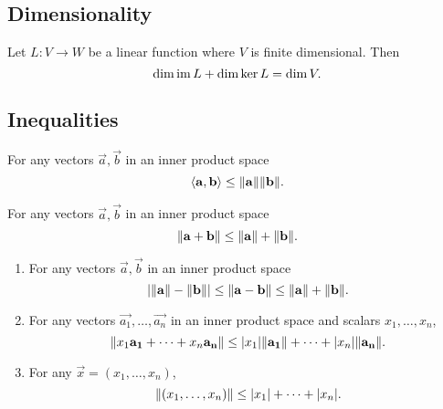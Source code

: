 \documentclass{article}
\begin{document}
\subsection{Dimensionality}
\begin{theorem}
    Let $L: V \rightarrow W$ be a linear function
    where $V$ is finite dimensional. Then
    \begin{equation}
        \dim \operatorname{im} L + \dim \ker L = \dim V.
    \end{equation}
\end{theorem}
\subsection{Inequalities}


\begin{theorem}
    For any vectors $\vec{a}, \vec{b}$ in an inner product space
    \begin{equation}
        \langle\mathbf{a}, \mathbf{b}\rangle \leq \lVert\mathbf{a}\rVert \lVert\mathbf{b}\rVert.
    \end{equation}
\end{theorem}

\begin{theorem}
    For any vectors $\vec{a}, \vec{b}$ in an inner product space
    \begin{equation}
        \lVert\mathbf{a} + \mathbf{b}\rVert \leq \lVert\mathbf{a}\rVert + \lVert\mathbf{b}\rVert.
    \end{equation}
\end{theorem}
\begin{corollary}
    \begin{enumerate}
        \item For any vectors $\vec{a}, \vec{b}$ in an inner product space
              \begin{equation}
                  \lvert\lVert \mathbf{a}\rVert - \lVert \mathbf{b}\rVert\rvert \leq \lVert\mathbf{a} - \mathbf{b}\rVert \leq \lVert\mathbf{a}\rVert + \lVert \mathbf{b}\rVert.
              \end{equation}
        \item For any vectors $\vec{a_1}, \ldots, \vec{a_n}$ in an inner product space and scalars $x_1, \ldots, x_n$,
              \begin{equation}
                  \lVert x_1\mathbf{a_1} + \cdots + x_n\mathbf{a_n}\rVert \leq |x_1| \lVert\mathbf{a_1}\rVert + \cdots + \lvert x_n\rvert\lVert\mathbf{a_n}\rVert.
              \end{equation}
        \item For any $\vec{x} = (x_1, \ldots, x_n)$,
              \begin{equation}
                  \lVert(x_1, \ldots, x_n)\rVert \leq \lvert x_1\rvert + \cdots + \lvert x_n\rvert.
              \end{equation}
    \end{enumerate}
\end{corollary}
\end{document}
